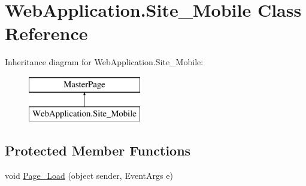 \hypertarget{classWebApplication_1_1Site__Mobile}{}\section{Web\+Application.\+Site\+\_\+\+Mobile Class Reference}
\label{classWebApplication_1_1Site__Mobile}
Inheritance diagram for Web\+Application.\+Site\+\_\+\+Mobile\+:\begin{figure}[H]
\begin{center}
\leavevmode
\includegraphics[height=2.000000cm]{da/d02/classWebApplication_1_1Site__Mobile}
\end{center}
\end{figure}
\subsection*{Protected Member Functions}
\begin{DoxyCompactItemize}
\item 
void \mbox{\hyperlink{classWebApplication_1_1Site__Mobile_a47842f83cf904552df612a7b2eb3d14c}{Page\+\_\+\+Load}} (object sender, Event\+Args e)
\end{DoxyCompactItemize}
